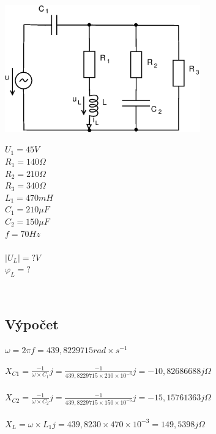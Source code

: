 \documentclass[12pt,a4paper,titlepage,final]{article}
\begin{document}
	\begin{minipage}[c]{0.6\textwidth}
		\includegraphics[height=5.5cm]{img/Pr4_2012.eps}
		\label{fig:pr4_obvod}
	\end{minipage}
	\begin{minipage}[c]{0.25\textwidth}
		$U_{1} = 45 V$ \\
		$R_{1} = 140 \Omega$ \\
		$R_{2} = 210 \Omega$ \\
		$R_{3} = 340 \Omega$ \\
		$L_{1} = 470 mH$ \\
		$C_{1} = 210 \mu F$ \\
		$C_{2} = 150 \mu F$ \\
		$f = 70 Hz$ \\
		\\
		$|U_{L}| = ? V$ \\
		$\varphi_{L} = ?$
	\end{minipage}
	\\


	\subsection*{Výpočet}

	$\omega = 2\pi f = 439,8229715 rad \times s^{-1}$
	
	\begin{tabbing}
		${ \displaystyle X_{C1} = 
		\frac{-1}{\omega \times C_{1}}j =
		\frac{-1}{439,8229715 \times 210 \times 10^{-6}}j = 
		-10,82686688j \Omega}$\\
		\\
		${ \displaystyle X_{C2} = 
		\frac{-1}{\omega \times C_{2}}j =
		\frac{-1}{439,8229715 \times 150 \times 10^{-6}}j = 
		-15,15761363j \Omega}$\\
		\\
		${ \displaystyle X_{L} = \omega \times L_{1}j = 
		439,8230 \times 470 \times 10^{-3} =
		149,5398j \Omega }$ \\
		\\
	\end{tabbing}
	
\end{document}
